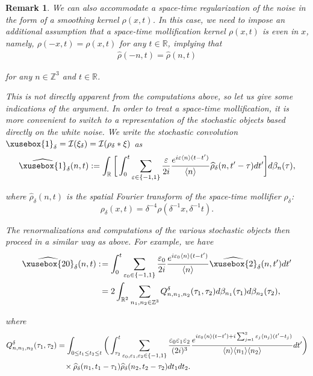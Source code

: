 \documentclass[%
11pt,  reqno]{amsart}
\def\<#1>{\xusebox{#1}}
\newtheorem{remark}[theorem]{Remark}
\newcommand{\1}{\hspace{0.2mm}\text{I}\hspace{0.2mm}}
\newcommand{\noi}{\noindent}
\newcommand{\Z}{\mathbb{Z}}
\newcommand{\R}{\mathbb{R}}
\newcommand{\dl}{\delta}
\newcommand{\eps}{\varepsilon}
\newcommand{\ft}{\widehat}
\newcommand{\jb}[1]
{\langle #1 \rangle}
\newcommand{\I}{\mathcal{I}}
\numberwithin{equation}{section}
\numberwithin{theorem}{section}
\begin{document}
\begin{remark}\label{REM:MAX}\rm
  We can also accommodate a space-time regularization of the noise in the form 
  of a smoothing kernel $\rho(x, t)$. 
In this case,  we need to impose an additional assumption
that a space-time mollification kernel $\rho(x, t)$ is even in $x$, 
namely, $\rho(-x, t) = \rho(x, t)$ for any $t \in \R$, implying that 
\begin{align}
\ft \rho(-n, t) = \ft \rho(n, t)
\label{P1}
\end{align}

\noi
for any $n \in \Z^3$ and $t \in \R$.


This is not
directly apparent from the computations above, so let us give some
indications of the argument. 
In order to treat a space-time mollification, 
 it is more
convenient to switch to a representation of the stochastic objects based
directly on the white noise. We write the stochastic convolution 
$\<1>_\dl = \I(\xi_\dl)
= \I(\rho_\dl * \xi)$
as
\begin{align}
 \ft{\<1>}_\dl (n, t) 
:= \int_\R \bigg[ \int_0^t 
\sum_{\eps \in \{ -1,  1 \}}
 \frac{\eps}{2 i} \frac{e^{i \eps \jb{n} (t - t')}}{\jb{n}} 
 \ft{\rho}_\dl (n, t' - \tau)  dt'
\bigg] d \beta_n (\tau),  
\label{P2}
\end{align}


\noi
  where $\ft{\rho}_\dl (n, t)$ is the spatial Fourier transform of the 
  space-time mollifier  $\rho_\dl$:
\[ \rho_\dl(x, t) = \dl^{-4} \rho(\dl^{-1} x, \dl^{-1}t).\]
  
\noi
The renormalizations and computations of the
various stochastic objects then proceed in a similar way as above. 
For example,  we have
\begin{align*}
  \ft{\<20>}_\dl  (n, t) 
  :\! & = \int_0^t 
\sum_{\eps_0 \in \{-1, 1\}}
\frac{\varepsilon_0}{2 i} 
\frac{e^{i \eps_0 \jb{n}(t - t')}}{\jb{n}}\ft{\<2>}_\dl  (n, t') dt'\\
& = 2 \int_{\R^2} \sum_{n_1, n_2 \in \Z^3} Q^\dl_{n, n_1, n_2} (\tau_1, \tau_2)d \beta_{n_1} (\tau_1)d
\beta_{n_2} (\tau_2) , 
\end{align*}

\noi
where 
\begin{align*}
Q_{n, n_1, n_2}^\dl (\tau_1, \tau_2) 
& = \int_{0 \leq t_1 \leq t_2 \leq t}
\bigg( \int^t_{\tau_2}\sum_{\eps_0, \eps_1, \eps_2 \in \{-1, 1\}}
 \frac{\eps_0
\eps_1 \eps_2}{(2 i)^3} \frac{e^{i \eps_0 \jb{n} (t - t') 
+ i \sum_{j = 1}^2 \eps_j \jb{ n_j } (t' - t_j )}}
{\jb{n} \jb{n_1}\jb{n_2}} dt' \bigg)\\
& 
\hphantom{X}
\times
\ft{\rho}_\dl (n_1, t_1 - \tau_1) \ft{\rho}_\dl (n_2, t_2 - \tau_2)d t_1 d
t_2. 
\end{align*} 


\end{remark}
\end{document}
